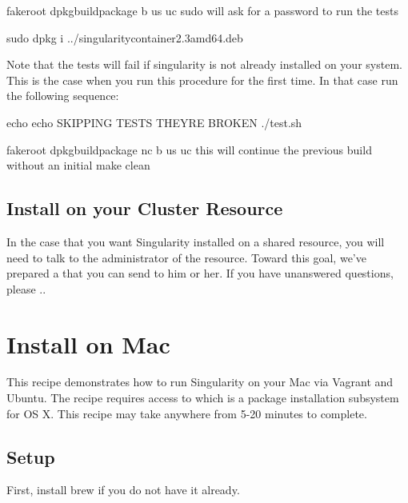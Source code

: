 \documentclass[letterpaper,10pt,english]{sphinxmanual}
\begin{document}
%
\begin{sphinxVerbatim}[commandchars=\\\{\}]
\PYGZdl{} fakeroot dpkg\PYGZhy{}buildpackage \PYGZhy{}b \PYGZhy{}us \PYGZhy{}uc \PYGZsh{} sudo will ask for a password to run the tests

\PYGZdl{} sudo dpkg \PYGZhy{}i ../singularity\PYGZhy{}container\PYGZus{}2.3\PYGZus{}amd64.deb
\end{sphinxVerbatim}

Note that the tests will fail if singularity is not already installed on your system. This is the case when you run this procedure for the first time. In that case run the following sequence:

%
\begin{sphinxVerbatim}[commandchars=\\\{\}]
\PYGZdl{} echo \PYGZdq{}echo SKIPPING TESTS THEYRE BROKEN\PYGZdq{} \PYGZgt{} ./test.sh

\PYGZdl{} fakeroot dpkg\PYGZhy{}buildpackage \PYGZhy{}nc \PYGZhy{}b \PYGZhy{}us \PYGZhy{}uc \PYGZsh{} this will continue the previous build without an initial \PYGZsq{}make clean\PYGZsq{}
\end{sphinxVerbatim}


\subsection{Install on your Cluster Resource}
\label{\detokenize{installation:install-on-your-cluster-resource}}
In the case that you want Singularity installed on a shared resource, you will need to talk to the administrator of the resource. Toward this goal, we’ve prepared a {\hyperref[\detokenize{installation:installation-request}]{}} that you can send to him or her. If you have unanswered questions, please ..


\section{Install on Mac}
\label{\detokenize{installation:install-on-mac}}
This recipe demonstrates how to run Singularity on your Mac via Vagrant and Ubuntu. The recipe requires access to  which is a package installation subsystem for OS X. This recipe may take anywhere from 5-20 minutes to complete.


\subsection{Setup}
\label{\detokenize{installation:id1}}
First, install brew if you do not have it already.
\end{document}
